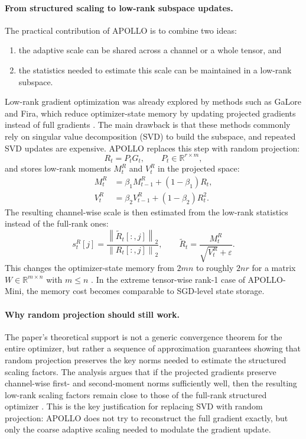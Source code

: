 \documentclass[10pt]{article}
\begin{document}
\paragraph{From structured scaling to low-rank subspace updates.}
The practical contribution of APOLLO is to combine two ideas:
\begin{enumerate}[leftmargin=1.5em]
  \item the adaptive scale can be shared across a channel or a whole tensor, and
  \item the statistics needed to estimate this scale can be maintained in a low-rank subspace.
\end{enumerate}
Low-rank gradient optimization was already explored by methods such as GaLore and Fira, which reduce optimizer-state memory by updating projected gradients instead of full gradients \cite{zhao2024galore, chen2024fira}. The main drawback is that these methods commonly rely on singular value decomposition (SVD) to build the subspace, and repeated SVD updates are expensive. APOLLO replaces this step with random projection:
\begin{equation}
R_t = P_t G_t, \qquad P_t \in \mathbb{R}^{r \times m},
\end{equation}
and stores low-rank moments $M_t^R$ and $V_t^R$ in the projected space:
\begin{align}
M_t^R &= \beta_1 M_{t-1}^R + (1-\beta_1) R_t, \\
V_t^R &= \beta_2 V_{t-1}^R + (1-\beta_2) R_t^2.
\end{align}
The resulting channel-wise scale is then estimated from the low-rank statistics instead of the full-rank ones:
\begin{equation}
s_t^R[j] = \frac{\left\| \widetilde{R}_t[:,j] \right\|_2}{\left\| R_t[:,j] \right\|_2}, \qquad
\widetilde{R}_t = \frac{M_t^R}{\sqrt{V_t^R} + \varepsilon}.
\end{equation}
This changes the optimizer-state memory from $2mn$ to roughly $2nr$ for a matrix $W \in \mathbb{R}^{m \times n}$ with $m \le n$ \cite{apollo2025}. In the extreme tensor-wise rank-1 case of APOLLO-Mini, the memory cost becomes comparable to SGD-level state storage.

\paragraph{Why random projection should still work.}
The paper's theoretical support is not a generic convergence theorem for the entire optimizer, but rather a sequence of approximation guarantees showing that random projection preserves the key norms needed to estimate the structured scaling factors. The analysis argues that if the projected gradients preserve channel-wise first- and second-moment norms sufficiently well, then the resulting low-rank scaling factors remain close to those of the full-rank structured optimizer \cite{apollo2025}. This is the key justification for replacing SVD with random projection: APOLLO does not try to reconstruct the full gradient exactly, but only the coarse adaptive scaling needed to modulate the gradient update.
\end{document}
